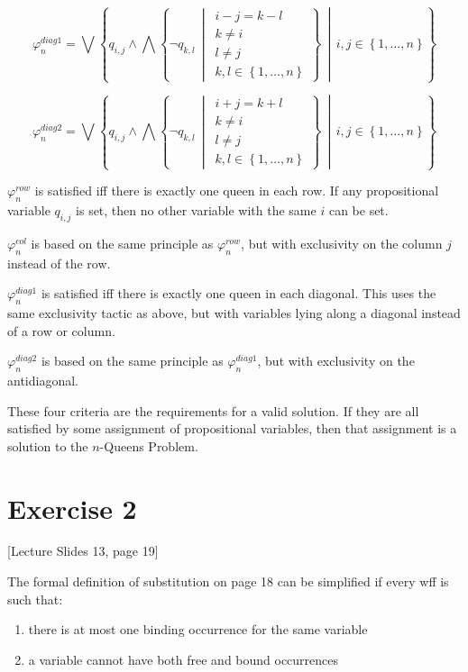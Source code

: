 \documentclass[12pt,leqno]{article}
\newcommand{\Mid}{\,\middle\vert\,}
\begin{document}
\[
  \varphi_n^{diag1} = \bigvee \left\{ q_{i, j} \land \bigwedge
    \left\{\lnot q_{k, l} \Mid \begin{array}{c}
      i - j = k - l \\
      k \ne i \\
      l \ne j \\
      k, l \in \left\{1, \ldots, n\right\}
    \end{array} \right\} \Mid i, j \in \left\{1, \ldots, n\right\} \right\}
\]

\[
  \varphi_n^{diag2} = \bigvee \left\{ q_{i, j} \land \bigwedge
    \left\{\lnot q_{k, l} \Mid \begin{array}{c}
      i + j = k + l \\
      k \ne i \\
      l \ne j \\
      k, l \in \left\{1, \ldots, n\right\}
    \end{array} \right\} \Mid i, j \in \left\{1, \ldots, n\right\} \right\}
\]

$\varphi_n^{row}$ is satisfied iff there is exactly one queen in each row. If
any propositional variable $q_{i, j}$ is set, then no other variable with the
same $i$ can be set.

$\varphi_n^{col}$ is based on the same principle as $\varphi_n^{row}$, but
with exclusivity on the column $j$ instead of the row.

$\varphi_n^{diag1}$ is satisfied iff there is exactly one queen in each
diagonal. This uses the same exclusivity tactic as above, but with variables
lying along a diagonal instead of a row or column.

$\varphi_n^{diag2}$ is based on the same principle as $\varphi_n^{diag1}$, but
with exclusivity on the antidiagonal.

These four criteria are the requirements for a valid solution. If they are
all satisfied by some assignment of propositional variables, then that
assignment is a solution to the $n$-Queens Problem.

\newpage
\section*{Exercise 2}

[Lecture Slides 13, page 19]

The formal definition of substitution on page 18 can be simplified if every
wff is such that:

\begin{enumerate}
  \item there is at most one binding occurrence for the same variable
  \item a variable cannot have both free and bound occurrences
\end{enumerate}
\end{document}
